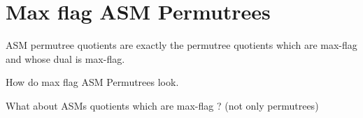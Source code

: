 \documentclass{article}
\begin{document}
	\section{Max flag ASM Permutrees}

    ASM permutree quotients are exactly the permutree quotients which are max-flag and whose dual is max-flag.
	
	\begin{question}
		\item How do max flag ASM Permutrees look.
	\end{question}

    \begin{question}
		\item What about ASMs quotients which are max-flag ? (not only permutrees)
	\end{question}
	
\end{document}
